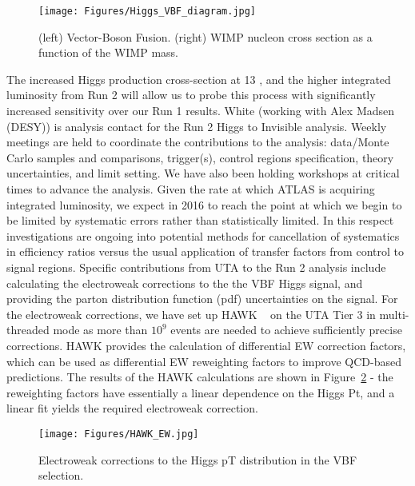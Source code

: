\begin{figure}[htb]
\centering

      \texttt{[image: Figures/Higgs\_VBF\_diagram.jpg]}
      \label{fig:Higgs_VBF_diagram}

\caption{(left) Vector-Boson Fusion. (right) WIMP nucleon cross section as a function of the WIMP mass.}
\end{figure}


The increased Higgs production cross-section at 13 \TeV, and the higher integrated luminosity from Run 2 will allow us to probe this process
with significantly increased sensitivity over our Run 1 results. White (working with Alex Madsen (DESY)) is analysis contact for the
Run 2 Higgs to Invisible analysis. Weekly meetings are held to coordinate the contributions to the analysis: data/Monte Carlo samples and 
comparisons, trigger(s), control regions specification, theory uncertainties, and limit setting. We have also been holding workshops 
at critical times to advance the analysis. 
Given the rate at which ATLAS is acquiring integrated luminosity, we expect in 2016 to reach the point at which we begin to be limited by 
systematic errors rather than statistically limited. In this respect investigations are ongoing into potential methods
for cancellation of systematics in efficiency ratios versus the usual application of transfer factors from control to signal regions.
Specific contributions from UTA to the Run 2 analysis include calculating the electroweak corrections to the the VBF Higgs signal, and
providing the parton distribution function (pdf) uncertainties on the signal. For the electroweak corrections, we have set up HAWK ~\cite{HAWK} 
on the UTA Tier 3 in multi-threaded 
mode as more than $10^{9}$ events are needed to achieve sufficiently precise corrections. HAWK provides the calculation of differential 
EW correction factors, which can be used as differential EW reweighting factors to improve QCD-based predictions. The results of the HAWK
calculations are shown in Figure~\ref{fig:HAWK_EW} - the reweighting factors have essentially a linear dependence on the Higgs Pt, and a linear fit
yields the required electroweak correction. 

\begin{figure}[htb]
\centering

      \texttt{[image: Figures/HAWK\_EW.jpg]}
      \label{fig:HAWK_EW}

\caption{Electroweak corrections to the Higgs pT distribution in the VBF selection.}
\end{figure}

